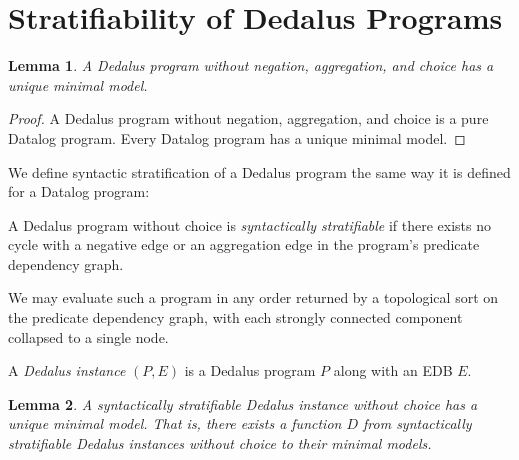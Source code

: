 
\section{Stratifiability of Dedalus Programs}

\newtheorem{lemma}{Lemma} 

\begin{lemma} 
%
A Dedalus program without negation, aggregation, and choice has a unique
minimal model.
%
\end{lemma}

\begin{proof} 
%
A Dedalus program without negation, aggregation, and choice is a pure Datalog
program.  Every Datalog program has a unique minimal model. 
%
\end{proof}



We define syntactic stratification of a Dedalus program the same way it is
defined for a Datalog program:

\begin{definition}
%
A Dedalus program without choice is \emph{syntactically stratifiable} if there
exists no cycle with a negative edge or an aggregation edge in the program's
predicate dependency graph.
%
\end{definition}


We may
evaluate such a program in any order returned by a topological sort on the predicate
dependency graph, with each strongly connected component collapsed to a single
node. 

\begin{definition}
%
A {\em Dedalus instance} $(P,E)$ is a Dedalus program $P$ along with an EDB
$E$.
%
\end{definition}

\begin{lemma}
%
A syntactically stratifiable Dedalus instance without choice has a unique
minimal model.  That is, there exists a function $D$ from syntactically
stratifiable Dedalus instances without choice to their minimal models.
%
\end{lemma}

